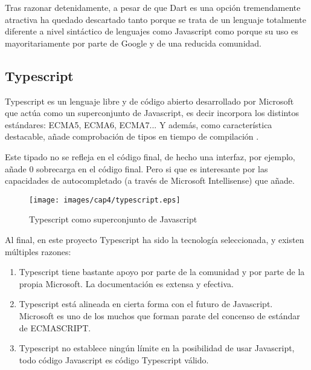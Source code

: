 \bigskip
Tras razonar detenidamente, a pesar de que Dart es una opción tremendamente atractiva ha quedado descartado tanto porque se trata de un 
lenguaje totalmente diferente a nivel sintáctico de lenguajes como Javascript como porque su uso es mayoritariamente por parte de Google y de una reducida comunidad.

\subsection{Typescript}

Typescript es un lenguaje libre y de código abierto desarrollado por Microsoft que actúa como un superconjunto
de Javascript, es decir incorpora los distintos estándares: ECMA5, ECMA6, ECMA7... Y además, como característica
destacable, añade comprobación de tipos en tiempo de compilación \cite{Typescript}. 

\bigskip
Este tipado no se refleja en el código final, de hecho una interfaz, por ejemplo,
añade 0 sobrecarga en el código final. Pero si que es interesante por las capacidades de
autocompletado (a través de Microsoft Intellisense)  que añade.

\begin{figure}[!th]
\begin{center}
\texttt{[image: images/cap4/typescript.eps]}
\caption{Typescript como superconjunto de Javascript}
\label{fig:Typescript como superconjunto de Javascript}
\end{center}
\end{figure}

\bigskip
Al final, en este proyecto Typescript ha sido la tecnología seleccionada, y existen múltiples
razones:

\begin{enumerate}

\item Typescript tiene bastante apoyo por parte de la comunidad y por parte de la propia Microsoft.
La documentación es extensa y efectiva.

\item Typescript está alineada en cierta forma con el futuro de Javascript. Microsoft es uno de los 
muchos que forman parate del concenso de estándar de ECMASCRIPT.

\item Typescript no establece ningún límite en la posibilidad de usar Javascript, todo código Javascript es código
Typescript válido.
\end{enumerate}

